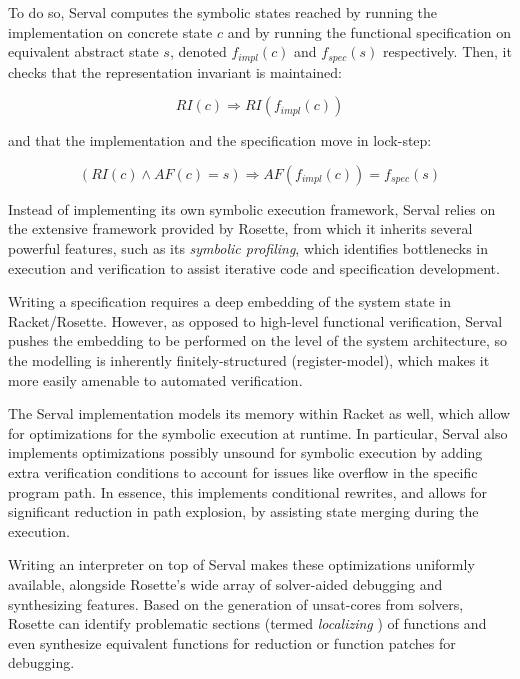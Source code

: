 \documentclass[11pt,a4paper]{article}
\newcommand{\serval}{Serval\xspace}
\newcommand{\racket}{\textsf{Racket}\xspace}
\newcommand{\rosette}{\textsf{Rosette}\xspace}
\begin{document}
To do so, \serval computes the symbolic states reached by running the
implementation on concrete state $c$ and by running the functional specification
on equivalent abstract state $s$, denoted $f_{impl}(c)$ and $f_{spec}(s)$
respectively. Then, it checks that the representation invariant is maintained:

$$
RI(c) \Rightarrow RI(f_{impl}(c))
$$

and that the implementation and the specification move in lock-step:

$$
 (RI(c) \land AF(c) = s) \Rightarrow AF(f_{impl}(c)) = f_{spec}(s)
$$



Instead of implementing its own symbolic execution framework, \serval relies on
the extensive framework provided by \rosette, from which it inherits several
powerful features, such as its \emph{symbolic profiling}, which identifies
bottlenecks in execution and verification to assist iterative code and
specification development.

Writing a specification requires a deep embedding of the system state in
\racket/\rosette. However, as opposed to high-level functional verification,
\serval pushes the embedding to be performed on the level of the system
architecture, so the modelling is inherently finitely-structured
(register-model), which makes it more easily amenable to automated verification. 

The \serval implementation models its memory within \racket as well, which allow
for optimizations for the symbolic execution at runtime. In particular, \serval
also implements optimizations possibly unsound for symbolic execution by adding
extra verification conditions to account for issues like overflow in the
specific program path. In essence, this implements conditional rewrites, and
allows for significant reduction in path explosion, by assisting state merging
during the execution. 

Writing an interpreter on top of \serval makes these optimizations uniformly
available, alongside \rosette's wide array of solver-aided debugging and
synthesizing features. Based on the generation of unsat-cores from solvers,
\rosette can identify problematic sections (termed \emph{localizing}
\cite{rosette}) of functions and even synthesize equivalent functions for
reduction or function patches for debugging.
\end{document}

